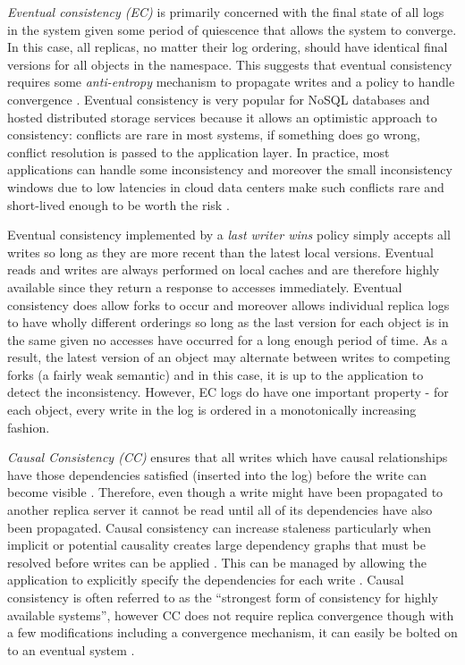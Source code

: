 \documentclass{article}
\begin{document}
\textit{Eventual consistency (EC)} is primarily concerned with the final state of all logs in the system given some period of quiescence that allows the system to converge. In this case, all replicas, no matter their log ordering, should have identical final versions for all objects in the namespace. This suggests that eventual consistency requires some \textit{anti-entropy} mechanism to propagate writes and a policy to handle convergence \cite{terry_managing_1995}. Eventual consistency is very popular for NoSQL databases and hosted distributed storage services \cite{decandia_dynamo:_2007,lakshman_cassandra:_2010} because it allows an optimistic approach to consistency: conflicts are rare in most systems, if something does go wrong, conflict resolution is passed to the application layer. In practice, most applications can handle some inconsistency and moreover the small inconsistency windows due to low latencies in cloud data centers make such conflicts rare and short-lived enough to be worth the risk \cite{bailis_quantifying_2014}.

Eventual consistency implemented by a \textit{last writer wins} policy simply accepts all writes so long as they are more recent than the latest local versions. Eventual reads and writes are always performed on local caches and are therefore highly available since they return a response to accesses immediately. Eventual consistency does allow forks to occur and moreover allows individual replica logs to have wholly different orderings so long as the last version for each object is in the same given no accesses have occurred for a long enough period of time. As a result, the latest version of an object may alternate between writes to competing forks (a fairly weak semantic) and in this case, it is up to the application to detect the inconsistency. However, EC logs do have one important property - for each object, every write in the log is ordered in a monotonically increasing fashion.

\textit{Causal Consistency (CC)} ensures that all writes which have causal relationships have those dependencies satisfied (inserted into the log) before the write can become visible \cite{ahamad_causal_1990}. Therefore, even though a write might have been propagated to another replica server it cannot be read until all of its dependencies have also been propagated. Causal consistency can increase staleness particularly when implicit or potential causality creates large dependency graphs that must be resolved before writes can be applied \cite{lloyd_dont_2011}. This can be managed by allowing the application to explicitly specify the dependencies for each write \cite{bailis_potential_2012}. Causal consistency is often referred to as the ``strongest form of consistency for highly available systems'', however CC does not require replica convergence \cite{guerraoui_consistency_2002} though with a few modifications including a convergence mechanism, it can easily be bolted on to an eventual system \cite{bailis_bolt-causal_2013}.
\end{document}
